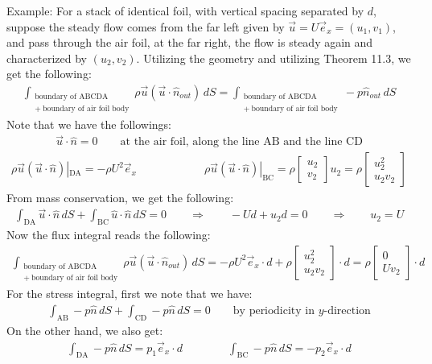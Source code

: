 \documentclass[11pt]{book}
\theoremstyle{break}
\theoremstyle{break}
\newcommand{\bmat}[1]{\begin{bmatrix} #1 \end{bmatrix}}
\newcommand{\example}{\color{green}Example: \color{black}}
\begin{document}
\example For a stack of identical foil, with vertical spacing separated by $d$, suppose the steady flow comes from the far left given by $\vec{u}=U \vec{e}_x= (u_1,v_1)$, and pass through the air foil, at the far right, the flow is steady again and characterized by $(u_2,v_2)$. Utilizing the geometry and utilizing Theorem 11.3, we get the following:
\begin{align}
\int_{\substack{\text{boundary of ABCDA }\\ +\ \text{boundary of air foil body}}} \rho\vec{u}( \vec{u}\cdot \hat{n}_{out})\, dS = \int_{\substack{\text{boundary of  ABCDA }\\ +\ \text{boundary of air foil body}}} -p \hat{n}_{out}\, dS
\end{align}
Note that we have the followings:
\begin{align*}
\vec{u}\cdot \hat{n} = 0  \qquad\text{at the air foil, along the line AB}\text{ and the line CD}
\end{align*}
\begin{align*}
\rho \vec{u}( \vec{u}\cdot \hat{n})|_{\text{DA}} = -\rho U^2\vec{e}_x \qquad\qquad\qquad \rho\vec{u}(\vec{u}\cdot \hat{n})|_{\text{BC}} =  \rho \bmat{u_2\\ v_2}u_2 = \rho \bmat{u_2^2 \\ u_2v_2}
\end{align*}
From mass conservation, we get the following:
\begin{align*}
\int_{\text{DA}} \vec{u}\cdot \hat{n} \, dS + \int_{\text{BC}} \hat{u}\cdot \hat{n}\, dS = 0 \qquad \Rightarrow \qquad -Ud + u_2 d = 0 \qquad \Rightarrow \qquad u_2 = U
\end{align*}
Now the flux integral reads the following:
\begin{align*}
\int_{\substack{\text{boundary of ABCDA }\\ +\ \text{boundary of air foil body}}} \rho\vec{u}( \vec{u}\cdot \hat{n}_{out})\, dS = -\rho U^2 \vec{e}_x \cdot d + \rho \bmat{u_2^2 \\ u_2v_2}\cdot d = \rho \bmat{0 \\ Uv_2} \cdot d
\end{align*}
For the stress integral, first we note that we have:
\begin{align*}
\int_{\text{AB}} -p \hat{n} \, dS + \int_{\text{CD}} -p \hat{n}\, dS = 0 \qquad \text{by periodicity in $y$-direction}
\end{align*}
On the other hand, we also get:
\begin{align*}
\int_{\text{DA}} -p \hat{n}\, dS = p_1 \vec{e}_x \cdot d \qquad \qquad \int_{\text{BC}}-p\hat{n}\, dS = -p_2  \vec{e}_x \cdot d
\end{align*}
\end{document}
